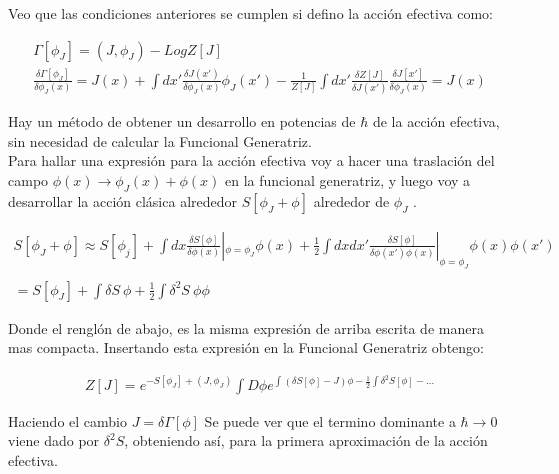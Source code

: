 Veo que las condiciones anteriores se cumplen si defino la acción efectiva como:

\begin{equation}
\begin{array}{c}
\Gamma [\phi _J] = (J, \phi _J) - Log Z [J] \\
\frac{\delta \Gamma [ \phi _J ]}{\delta \phi _J (x) } = 
J(x) + \int dx ' \frac{\delta J (x')}{\delta \phi _J (x) } \phi _J (x') - 
\frac{1}{Z[J]} \int dx' \frac{\delta Z[J] }{\delta J(x')} \frac{\delta J[x']}{\delta \phi _J (x)} = J(x)
\end{array}
\end{equation}

Hay un método de obtener un desarrollo en potencias de $\hbar$ de la acción efectiva, sin necesidad de calcular la Funcional Generatriz. \\


Para hallar una expresión para la acción efectiva voy a hacer una traslación del campo $\phi (x) \rightarrow \phi _{J} (x) + \phi (x) $ en la funcional generatriz, y luego voy a desarrollar la acción clásica alrededor  $ S[ \phi _J + \phi ] $ alrededor de $ \phi _J $ .

\begin{equation}
\begin{array}{c}
S [\phi _J + \phi ] \approx
S[ \phi _j ] +
\int dx \frac{\delta S[\phi]}{\delta \phi (x) } | _ {\phi = \phi _J} \phi( x ) +
\frac{1}{2}
\int dx dx' \frac{\delta S[\phi]}{\delta \phi (x') \phi (x) } | _ {\phi = \phi _J} \phi( x ) \phi (x')  \\ \\
= S[ \phi _J ] + \int \delta S \ \phi + \frac{1}{2} \int \delta ^2 S \ \phi \phi
\end{array}
\end{equation}

Donde el renglón de abajo, es la misma expresión de arriba escrita de manera mas compacta. Insertando  esta expresión en la Funcional Generatriz obtengo:

\begin{equation}
\begin{array}{c}
Z[J] = e ^{-S[ \phi _J ] + (J, \phi _J )} 
\int D \phi e ^{ \int (\delta S [\phi] - J) \phi - \frac{1}{2} \int \delta ^2 S[\phi ] - ... }
\end{array}
\end{equation}

Haciendo el cambio $J = \delta \Gamma [ \phi ]$ Se puede ver que el termino dominante a $\hbar \rightarrow 0$ viene dado por $\delta ^2 S$, obteniendo así, para la primera aproximación de la acción efectiva.






